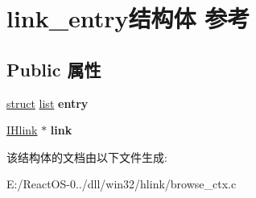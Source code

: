 \hypertarget{structlink__entry}{}\section{link\+\_\+entry结构体 参考}
\label{structlink__entry}
\subsection*{Public 属性}
\begin{DoxyCompactItemize}
\item 
\mbox{\label{structlink__entry_a090df68c1d0303a6624342d91c430de9}} 
\hyperlink{interfacestruct}{struct} \hyperlink{classlist}{list} {\bfseries entry}
\item 
\mbox{\label{structlink__entry_a55af141a9834fe7bb1dd30f13183231e}} 
\hyperlink{interface_i_hlink}{I\+Hlink} $\ast$ {\bfseries link}
\end{DoxyCompactItemize}


该结构体的文档由以下文件生成\+:\begin{DoxyCompactItemize}
\item 
E\+:/\+React\+O\+S-\/0../dll/win32/hlink/browse\+\_\+ctx.\+c\end{DoxyCompactItemize}
